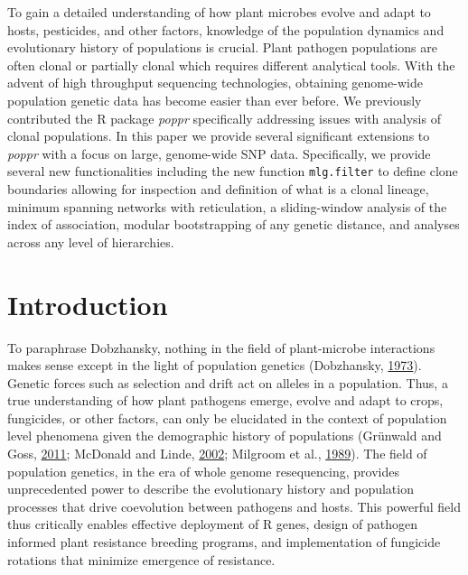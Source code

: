 \documentclass[double,12pt]{beavtex}
\begin{document}
  To gain a detailed understanding of how plant microbes evolve and adapt
  to hosts, pesticides, and other factors, knowledge of the population
  dynamics and evolutionary history of populations is crucial. Plant
  pathogen populations are often clonal or partially clonal which requires
  different analytical tools. With the advent of high throughput
  sequencing technologies, obtaining genome-wide population genetic data
  has become easier than ever before. We previously contributed the R
  package \emph{poppr} specifically addressing issues with analysis of
  clonal populations. In this paper we provide several significant
  extensions to \emph{poppr} with a focus on large, genome-wide SNP data.
  Specifically, we provide several new functionalities including the new
  function \texttt{mlg.filter} to define clone boundaries allowing for
  inspection and definition of what is a clonal lineage, minimum spanning
  networks with reticulation, a sliding-window analysis of the index of
  association, modular bootstrapping of any genetic distance, and analyses
  across any level of hierarchies.
  
  \section{Introduction}\label{introduction-1}
  
  To paraphrase Dobzhansky, nothing in the field of plant-microbe
  interactions makes sense except in the light of population genetics
  (Dobzhansky, \protect\hyperlink{ref-dobzhansky2013nothing}{1973}).
  Genetic forces such as selection and drift act on alleles in a
  population. Thus, a true understanding of how plant pathogens emerge,
  evolve and adapt to crops, fungicides, or other factors, can only be
  elucidated in the context of population level phenomena given the
  demographic history of populations (Grünwald and Goss,
  \protect\hyperlink{ref-grunwald2011evolution}{2011}; McDonald and Linde,
  \protect\hyperlink{ref-Mcdonald2002}{2002}; Milgroom et al.,
  \protect\hyperlink{ref-milgroom1989population}{1989}). The field of
  population genetics, in the era of whole genome resequencing, provides
  unprecedented power to describe the evolutionary history and population
  processes that drive coevolution between pathogens and hosts. This
  powerful field thus critically enables effective deployment of R genes,
  design of pathogen informed plant resistance breeding programs, and
  implementation of fungicide rotations that minimize emergence of
  resistance.
  
\end{document}
